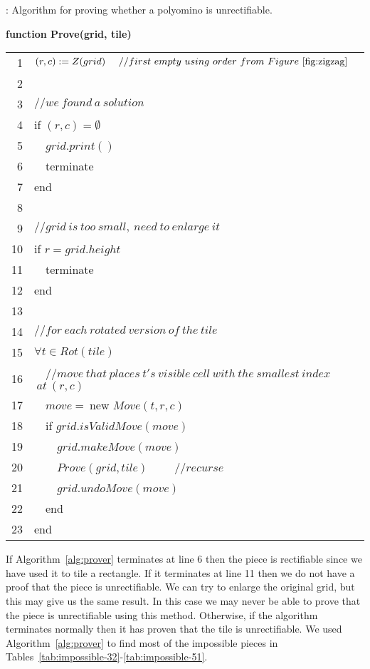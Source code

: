 \documentclass[10pt,a4paper]{article}
\theoremstyle{definition}
\begin{document}
\begin{algorithm}[!htpb]
\renewcommand{\arraystretch}{1.15}
\caption{: Algorithm for proving whether a polyomino is unrectifiable.}
\vspace{0.5ex}
\bf function Prove(grid, tile) \\
\begin{tabular}{rl}
\\
1 & $(r,c):=Z(grid)~~~~//first~empty~using~order~from~Figure~\ref{fig:zigzag}$ \\
2 & \\
3 & $//we~found~a~solution$ \\
4 & if $(r,c)=\emptyset$ \\
5 & ~~$grid.print()$ \\
6 & ~~terminate \\
7 & end \\
8 & \\
9 & $//grid~is~too~small,~need~to~enlarge~it$ \\
10 & if $r=grid.height$ \\
11 & ~~terminate \\
12 & end \\
13 & \\
14 & $//for~each~rotated~version~of~the~tile$ \\
15 & $\forall t \in Rot(tile)$ \\
16 & ~~$//move~that~places~t's~visible~cell~with~the~smallest~index$\footnotemark $~at~(r,c)$ \\
17 & ~~$move=~$new $Move(t,r,c)$ \\
18 & ~~if $grid.isValidMove(move)$ \\
19 & ~~~~$grid.makeMove(move)$ \\
20 & ~~~~$Prove(grid,tile)$ ~~~~$//recurse$\\
21 & ~~~~$grid.undoMove(move)$ \\
22 & ~~end \\
23 & end \\
\end{tabular}
\label{alg:prover}
\end{algorithm}

If Algorithm~\ref{alg:prover} terminates at line 6 then the piece is rectifiable since we have used it to tile a rectangle.
If it terminates at line 11 then we do not have a proof that the piece is unrectifiable. We can try to enlarge the original
grid, but this may give us the same result. In this case we may never be able to prove that the piece is unrectifiable using this method.
Otherwise, if the algorithm terminates normally then it has proven that the tile is unrectifiable. 
We used Algorithm~\ref{alg:prover} to find most of the impossible pieces in Tables~\ref{tab:impossible-32}-\ref{tab:impossible-51}.
\end{document}

